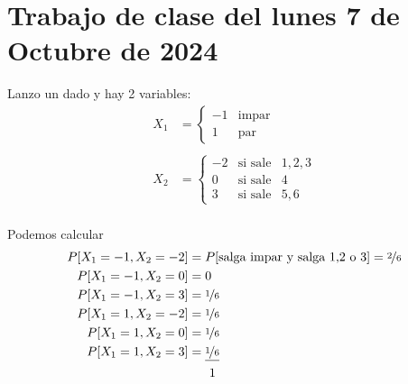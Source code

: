 \section{Trabajo de clase del lunes 7 de Octubre de 2024}

\begin{ejercicio}
    Lanzo un dado y hay 2 variables:
    \begin{align*}
        X_1 &= \left\{
        \begin{array}{cc}
            -1 & \text{impar}\\
            1 & \text{par}
        \end{array}
        \right.\\\\
        X_2 &= \left\{
        \begin{array}{ccc}
            -2 & \text{si sale} & 1,2,3\\
            0 & \text{si sale} & 4\\
            3 & \text{si sale} & 5,6
        \end{array}
        \right.\\
    \end{align*}

    Podemos calcular
    \begin{align*}
        P[X_1 = -1, X_2 = -2] &= P[\text{salga impar y salga 1,2 o 3}] = \nicefrac{2}{6}\\
        P[X_1 = -1, X_2 = 0] & = 0\\
        P[X_1 = -1, X_2 = 3] & = \nicefrac{1}{6}\\
        P[X_1 = 1, X_2 = -2] & = \nicefrac{1}{6}\\
        P[X_1 = 1, X_2 = 0] & = \nicefrac{1}{6}\\
        P[X_1 = 1, X_2 = 3] & = \underline{\nicefrac{1}{6}}\\
        & \ \ \ \ \ 1
    \end{align*}


\end{ejercicio}
